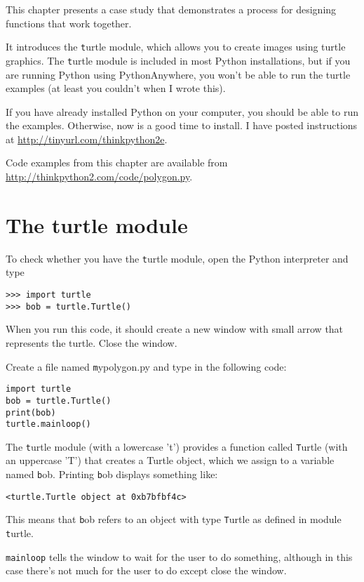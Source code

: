 \documentclass[
DIV=11,
fontsize=12,
twoside,
headinclude=false,
titlepage=firstiscover,
abstract=true,
headsepline=true,
footsepline=true,
chapterprefix=true, %
headings=big,
bibliography=totoc,%
captions=tableheading
]{scrbook}
\theoremstyle{definition}
\begin{document}
This chapter presents a case study that demonstrates a process for
designing functions that work together.

It introduces the {\texttt turtle} module, which allows you to
create images using turtle graphics.  The {\texttt turtle} module is
included in most Python installations, but if you are running Python
using PythonAnywhere, you won't be able to run the turtle examples (at
least you couldn't when I wrote this).

If you have already installed Python on your computer, you should
be able to run the examples.  Otherwise, now is a good time
to install.  I have posted instructions at
\url{http://tinyurl.com/thinkpython2e}.

Code examples from this chapter are available from
\url{http://thinkpython2.com/code/polygon.py}.


\section{The turtle module}
\label{turtle}

To check whether you have the {\texttt turtle} module, open the Python
interpreter and type

\begin{lstlisting}
>>> import turtle
>>> bob = turtle.Turtle()
\end{lstlisting}

When you run this code, it should create a new window
with small arrow that represents the turtle.  Close the window.

Create a file named {\texttt mypolygon.py} and type in the following
code:

\begin{lstlisting}
import turtle
bob = turtle.Turtle()
print(bob)
turtle.mainloop()
\end{lstlisting}
%
The {\texttt turtle} module (with a lowercase 't') provides a function
called {\texttt Turtle} (with an uppercase 'T') that creates a Turtle
object, which we assign to a variable named {\texttt bob}.
Printing {\texttt bob} displays something like:

\begin{lstlisting}
<turtle.Turtle object at 0xb7bfbf4c>
\end{lstlisting}
%
This means that {\texttt bob} refers to an object with type
{\texttt Turtle}
as defined in module {\texttt turtle}.

\verb"mainloop" tells the window to wait for the user
to do something, although in this case there's not much for
the user to do except close the window.
\end{document}
